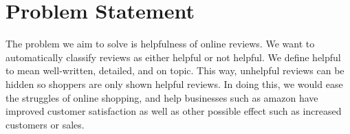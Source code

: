 \section{Problem Statement}
The problem we aim to solve is helpfulness of online reviews.
We want to automatically classify reviews as either helpful or not helpful.
We define helpful to mean well-written, detailed, and on topic.
This way, unhelpful reviews can be hidden so shoppers are only shown helpful reviews. 
In doing this, we would ease the struggles of online shopping, and help businesses such as amazon have improved customer satisfaction as well as other possible effect such as increased customers or sales. 

